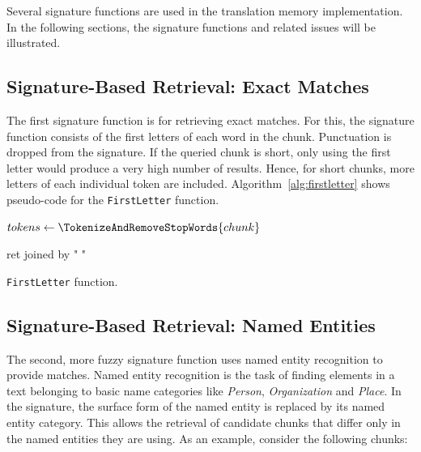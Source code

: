 Several signature functions are used in the translation memory
implementation. In the following sections, the signature functions and related issues will be illustrated.


\subsection{Signature-Based Retrieval: Exact Matches}

The first signature function is for retrieving exact matches. For this,
the signature function consists of the first letters of each word in the
chunk. Punctuation is dropped from the signature. If the queried chunk is
short, only using the first letter would produce a very high number of
results. Hence, for short chunks, more letters of each individual token are
included. Algorithm~\ref{alg:firstletter} shows pseudo-code for the {\tt FirstLetter}
function.

\vspace{1em}
\begin{algorithm}[H]
\label{alg:firstletter}


 \SetAlgoLined

 $tokens \leftarrow \TokenizeAndRemoveStopWords{chunk}$

 \Return ret joined by " "
 \caption{{\tt FirstLetter} function.}
\end{algorithm}


\subsection{Signature-Based Retrieval: Named Entities}

The second, more fuzzy signature function uses named entity recognition
to provide matches. Named entity recognition is the task of finding
elements in a text belonging to basic name categories like
\emph{Person}, \emph{Organization} and \emph{Place}. In the signature,
the surface form of the named entity is replaced by its named entity
category. This allows the retrieval of candidate chunks that differ only
in the named entities they are using. As an example, consider the
following chunks:

